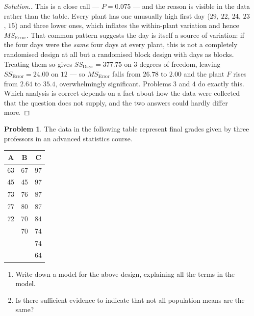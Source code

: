 \documentclass[11pt,a4paper]{article}
\theoremstyle{definition}
\newtheorem{problemx}{Problem}[section]
\newenvironment{problem}{\begin{problemx}}{\end{problemx}}
\newenvironment{solution}
  {\renewcommand{\qedsymbol}{}\begin{proof}[\textit{Solution}.]}
  {\end{proof}}
\begin{document}
\begin{solution}
This is a close call --- $P=0.075$ --- and the reason is visible in the data rather than the
table. Every plant has one unusually high first day ($29$, $22$, $24$, $23$, $15$) and three
lower ones, which inflates the within-plant variation and hence $MS_{\text{Error}}$. That
common pattern suggests the day is itself a source of variation: if the four days were the
\emph{same} four days at every plant, this is not a completely randomised design at all but
a randomised block design with days as blocks. Treating them so gives
$SS_{\text{Days}}=377.75$ on $3$ degrees of freedom, leaving $SS_{\text{Error}}=24.00$ on
$12$ --- so $MS_{\text{Error}}$ falls from $26.78$ to $2.00$ and the plant $F$ rises from
$2.64$ to $35.4$, overwhelmingly significant. Problems 3 and 4 do exactly this. Which
analysis is correct depends on a fact about how the data were collected that the question
does not supply, and the two answers could hardly differ more.
\end{solution}

\begin{problem}
The data in the following table represent final grades given by three professors in an
advanced statistics course.
\begin{table}[H]
\centering
\begin{tabular}{ccc}
A & B & C\\
\hline
63 & 67 & 97\\
45 & 45 & 97\\
73 & 76 & 87\\
77 & 80 & 87\\
72 & 70 & 84\\
& 70 & 74\\
& & 74\\
& & 64\\
\end{tabular}
\end{table}
\begin{enumerate}
\item[(a).] Write down a model for the above design, explaining all the terms in the model.
\item[(b).] Is there sufficient evidence to indicate that not all population means are the
same?
\end{enumerate}
\end{problem}
\end{document}
